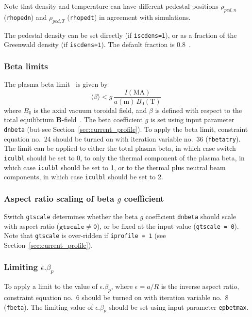 \documentclass[11pt,a4paper]{report}
\begin{document}
Note that density and temperature can have different pedestal positions
$\rho_{ped,n}$ (\texttt{rhopedn}) and $\rho_{ped,T}$ (\texttt{rhopedt}) in
agreement with simulations.

The pedestal density can be set directly (if \texttt{iscdens=1}), or as a fraction of the Greenwald density (if \texttt{iscdens=1}).  The default fraction is 0.8~\cite{Bernert}. 

\subsubsection{Beta limits}

The plasma beta limit~\cite{IPDG,172} is given by
\begin{equation}
\langle \beta \rangle < g \, \frac{I(\mbox{MA})}{a(\mbox{m}) \, B_0(\mbox{T})}
\label{eqn:troyon}
\end{equation}
where $B_0$ is the axial vacuum toroidal field, and $\beta$ is defined with
respect to the total equilibrium $\mathbf{B}$-field~\cite{172}. The beta
coefficient $g$ is set using input parameter \texttt{dnbeta} (but see
Section~\ref{sec:current_profile}). To apply the beta limit, constraint
equation no.\ 24 should be turned on with iteration variable no.\ 36
(\texttt{fbetatry}). The limit can be applied to either the total plasma beta,
in which case switch \texttt{iculbl} should be set to 0, to only the thermal
component of the plasma beta, in which case \texttt{iculbl} should be set to
1, or to the thermal plus neutral beam components, in which case
\texttt{iculbl} should be set to 2.

\subsubsection*{Aspect ratio scaling of beta $g$ coefficient}

Switch \texttt{gtscale} determines whether the beta $g$ coefficient
\texttt{dnbeta} should scale with aspect ratio ($\mathtt{gtscale \not= 0}$),
or be fixed at the input value (\texttt{gtscale = 0}). Note that
\texttt{gtscale} is over-ridden if \texttt{iprofile = 1} (see
Section~\ref{sec:current_profile}).

\subsubsection*{Limiting $\epsilon.\beta_p$}

To apply a limit to the value of $\epsilon.\beta_p$, where $\epsilon = a/R$ is
the inverse aspect ratio, constraint equation no.\ 6 should be turned on with
iteration variable no.\ 8 (\texttt{fbeta}). The limiting value of
$\epsilon.\beta_p$ should be set using input parameter \texttt{epbetmax}.
\end{document}

